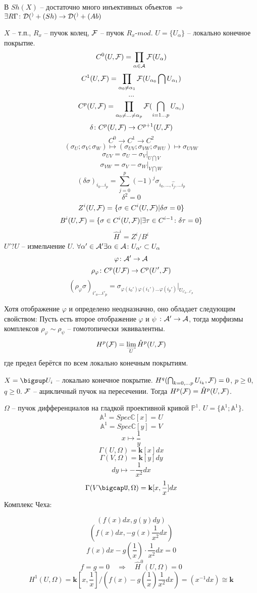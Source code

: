\documentclass[../main.tex]{subfiles}
\begin{document}
\begin{to_com}
В $Sh(X)$ -- достаточно много инъективных объектов $\Rightarrow$ $\exists R \Gamma \colon \mathcal{D(^)}+(Sh) \to \mathcal{D(^)}+(Ab)$
\end{to_com}
\begin{to_def}
$X$ -- т.п., $R_x$ -- пучок колец, $\mathcal{F}$ -- пучок $R_x$-$mod$. $U = \lbrace U_{\alpha}\rbrace$ -- локально конечное покрытие.
\[C^0(U, \mathcal{F}) = \prod_{\alpha\in \mathcal{A}}\mathcal{F}(U_{\alpha})\]
\[C^1(U, \mathcal{F}) = \prod_{\alpha_0 \neq \alpha_1 }\mathcal{F}(U_{\alpha_0}\bigcap U_{\alpha_1})\]
\[\ldots\]
\[C^p(U, \mathcal{F}) = \prod_{\alpha_0 \neq \ldots \neq \alpha_p}\mathcal{F}(\bigcap_{i = 1\ldots p}U_{\alpha_i})\]
\[\delta\colon C^p(U, \mathcal{F}) \to C^{p+1}(U, \mathcal{F})\]
\[C^0 \to C^1 \to C^2\]
\[(\sigma_U; \sigma_V; \sigma_W) \mapsto (\sigma_{UV};\sigma_{VW};\sigma_{WU}) \mapsto \sigma_{UVW} \]
\[\sigma_{UV} = \sigma_U - \sigma_V\vert_{U\bigcap V}\]
\[\sigma_{VW} = \sigma_V - \sigma_W\vert_{V\bigcap W}\]
\[(\delta \sigma)_{i_0\ldots i_{p}} = \sum_{j=0}^{p}(-1)^j\sigma_{i_0, \ldots, \hat{i_j}, \ldots i_{p}}\]
\[\delta^2 = 0\]
\[Z^i (U, \mathcal{F})= \lbrace \sigma \in C^i(U, \mathcal{F})\vert \delta\sigma = 0\rbrace\]
\[B^i (U, \mathcal{F})= \lbrace \sigma \in C^i(U, \mathcal{F})\vert \exists \tau \in C^{i-1} \colon \delta \tau = 0 \rbrace\]
\[\hat{H}^i = Z^i / B^i\]
$U' ? U$ -- измельчение $U$. $\forall \alpha'\in \mathcal{A}' \exists \alpha\in \mathcal{A} \colon U_{\alpha'}\subset U_{\alpha}$
\[\varphi \colon \mathcal{A}' \to \mathcal{A}\]
\[\rho_{\varphi}\colon C^p (U \mathcal{F}) \to C^p(U', \mathcal{F})\]
\[(\rho_{\varphi}\sigma)_{i'_o\ldots i'_p} = \sigma_{\varphi(i_0')\varphi(i_1')\ldots\varphi(i_p')}\vert_{U_{i'_0\ldots i'_p}}\]
\end{to_def}
Хотя отображение $\varphi$ и определено неодназначно, оно обладает следующим свойством: Пусть есть второе отображение $\varphi$ и $\psi$ $\colon \mathcal{A}' \to \mathcal{A}$, тогда морфизмы комплексов $\rho_\varphi\sim \rho_{\psi}$ -- гомотопически эквивалентны.
\[H^p(\F) = \varinjlim_{U}\hat{H}^p(U, \F)\]
где предел берётся по всем локально конечным покрытиям.
\begin{to_thr}
$X = \bigsup U_i$ -- локально конечное покрытие. $H^q (\bigcap_{k = 0, \ldots p}U_{i_k}, \mathcal{F}) = 0$, $p\ge 0$, $q\ge 0$. $\mathcal{F}$ -- ацикличный пучок на пересечении. Тогда $H^p(\mathcal{F}) = \hat{H}^p(U, \mathcal{F})$.
\end{to_thr}
\begin{to_ex}
$\Omega$ -- пучок дифференциалов на гладкой проективной кривой $\mathbb{P}^1$. $U = \lbrace \mathbb{A}^1; \mathbb{A}^1\rbrace$.\\
\[\mathbb{A}^1 = Spec\mathbb{C}[x] = U\] 
\[\mathbb{A}^1 = Spec\mathbb{C}[y] = V\]
\[x\mapsto \dfrac{1}{y}\]
\[\Gamma(U, \Omega) = \mathbf{k}[x]dx\]
\[\Gamma(V, \Omega) = \mathbf{k}[y]dy\]
\[dy \mapsto -\dfrac{1}{x^2}dx\]
\[\Gamma(V\bigcapU, \Omega) = \mathbf{k}[x, \dfrac{1}{x}]dx\]
Комплекс Чеха:
\bee
{}
\eee
\[(f(x)dx, g(y)dy)\]
\[(f(x)dx, -g(x)\dfrac{1}{x^2}dx)\]
\[f(x)dx - g(\dfrac{1}{x})\cdot \dfrac{1}{x^2}dx = 0\]
\[f = g = 0 \quad \Rightarrow \quad \hat{H}^0(U, \Omega) = 0\]
\[H^1(U, \Omega) = \mathbf{k}[x, \dfrac{1}{x}]/(f(x)-g(\dfrac{1}{x})\dfrac{1}{x^2}dx) = (x^{-1}dx)\cong \mathbf{k}\]
\end{to_ex}
\end{document}
